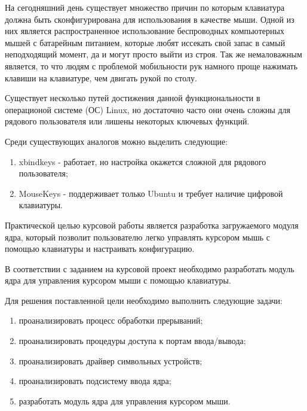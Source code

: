 \newpage
{}
На сегодняшний день существует множество причин по которым клавиатура должна быть сконфигурирована для использования в качестве мыши.
Одной из них является распространенное использование беспроводных компьютерных мышей с батарейным питанием, которые любят иссекать свой запас в самый неподходящий момент, да и могут просто выйти из строя.
Так же немаловажным является, то что людям с проблемой мобильности рук намного проще нажимать клавиши на клавиатуре, чем двигать рукой по столу.

Существует несколько путей достижения данной функциональности в операционой системе (ОС) Linux, но достаточно часто они очень сложны для рядового пользователя или лишены некоторых ключевых функций.

Среди существующих аналогов можно выделить следующие:
\begin{enumerate}
	\item xbindkeys - работает, но настройка окажется сложной для рядового пользователя;
	\item MouseKeys - поддерживает только Ubuntu и требует наличие цифровой клавиатуры.
\end{enumerate}

Практической целью курсовой работы является разработка загружаемого модуля ядра, который позволит пользователю легко управлять курсором мышь с помощью клавиатуры и настраивать конфигурацию.

В соответствии с заданием на курсовой проект необходимо разработать модуль ядра для управления курсором мыши с помощью клавиатуры.

Для решения поставленной цели необходимо выполнить следующие задачи:
\begin{enumerate}
	\item проанализировать процесс обработки прерываний;
	\item проанализировать процедуры доступа к портам ввода/вывода;
	\item проанализировать драйвер символьных устройств;
	\item проанализировать подсистему ввода ядра;
	\item разработать модуль ядра для управления курсором мыши.
\end{enumerate}

